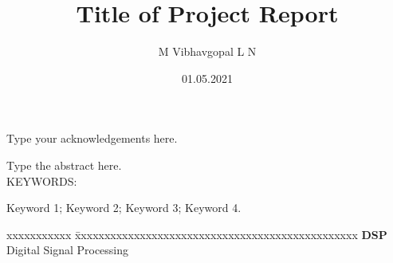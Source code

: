 \documentclass[BTech]{iiitdmdiss}
\begin{document}
\title{Title of Project Report}
\author{M Vibhavgopal L N}
\date{01.05.2021}

\maketitle

\declaration


\certificate
\acknowledgements

Type your acknowledgements here.

\abstract

Type the abstract here.
\\
\vspace{10pt}
\noindent KEYWORDS: \hspace*{0.5em} \parbox[t]{4.4in}{Keyword 1; Keyword 2; Keyword 3; Keyword 4.}


\pagebreak


\begin{singlespace}
\tableofcontents
\thispagestyle{empty}

\listoftables
{}
\listoffigures
{}
\end{singlespace}


\abbreviations

\noindent 
\begin{tabbing}
xxxxxxxxxxx \= xxxxxxxxxxxxxxxxxxxxxxxxxxxxxxxxxxxxxxxxxxxxxxxx \kill
\textbf{DSP}   \> Digital Signal Processing\\

\end{tabbing}
\end{document}
